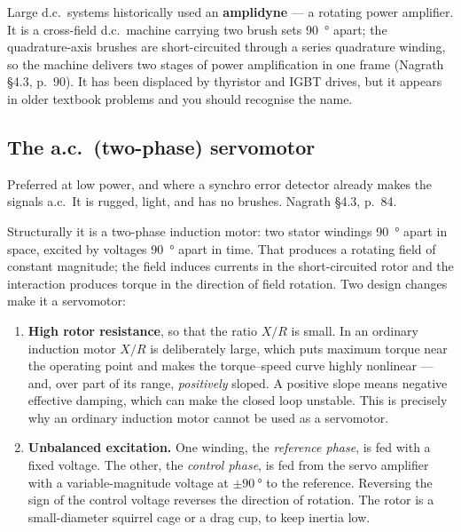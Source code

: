 \documentclass[11pt,a4paper]{article}
\begin{document}
Large d.c.\ systems historically used an \textbf{amplidyne} --- a rotating
power amplifier. It is a cross-field d.c.\ machine carrying two brush sets
\SI{90}{\degree} apart; the quadrature-axis brushes are short-circuited through
a series quadrature winding, so the machine delivers two stages of power
amplification in one frame (Nagrath \S4.3, p.~90). It has been displaced by
thyristor and IGBT drives, but it appears in older textbook problems and you
should recognise the name.

\subsection{The a.c.\ (two-phase) servomotor}

Preferred at low power, and where a synchro error detector already makes the
signals a.c.\ It is rugged, light, and has no brushes. Nagrath \S4.3, p.~84.

Structurally it is a two-phase induction motor: two stator windings
\SI{90}{\degree} apart in space, excited by voltages \SI{90}{\degree} apart in
time. That produces a rotating field of constant magnitude; the field induces
currents in the short-circuited rotor and the interaction produces torque in
the direction of field rotation. Two design changes make it a servomotor:

\begin{enumerate}[leftmargin=*]
\item \textbf{High rotor resistance}, so that the ratio $X/R$ is small. In an
      ordinary induction motor $X/R$ is deliberately large, which puts maximum
      torque near the operating point and makes the torque--speed curve highly
      nonlinear --- and, over part of its range, \emph{positively} sloped. A
      positive slope means negative effective damping, which can make the
      closed loop unstable. This is precisely why an ordinary induction motor
      cannot be used as a servomotor.
\item \textbf{Unbalanced excitation.} One winding, the \emph{reference phase},
      is fed with a fixed voltage. The other, the \emph{control phase}, is fed
      from the servo amplifier with a variable-magnitude voltage at
      $\pm\SI{90}{\degree}$ to the reference. Reversing the sign of the control
      voltage reverses the direction of rotation. The rotor is a small-diameter
      squirrel cage or a drag cup, to keep inertia low.
\end{enumerate}
\end{document}
